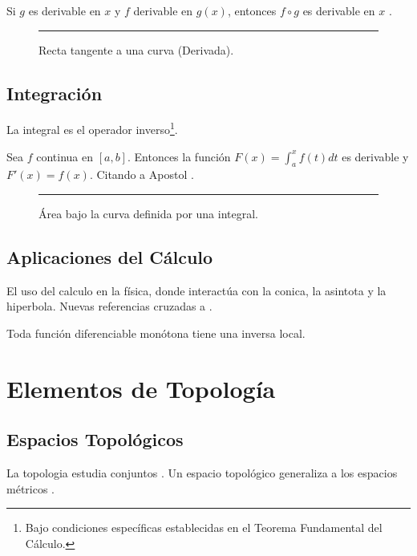 	\begin{lemma}
		Si $g$ es derivable en $x$ y $f$ derivable en $g(x)$, entonces $f \circ g$ es derivable en $x$ \cite{rudin}.
	\end{lemma}
	
	\begin{figure}[h]
		\centering
		\rule{5cm}{3cm}
		\caption{Recta tangente a una curva (Derivada).}
	\end{figure}
	
	\section{Integración}
	La \gls{integral} es el operador inverso\footnote{Bajo condiciones específicas establecidas en el Teorema Fundamental del Cálculo.}.
	
	\begin{theorem}
		Sea $f$ continua en $[a,b]$. Entonces la función $F(x) = \int_a^x f(t)dt$ es derivable y $F'(x) = f(x)$. Citando a Apostol \cite{apostol}.
	\end{theorem}
	
	\begin{figure}[h]
		\centering
		\rule{5cm}{3cm}
		\caption{Área bajo la curva definida por una integral.}
	\end{figure}
	
	\section{Aplicaciones del Cálculo}
	El uso del \gls{calculo} en la física, donde interactúa con la \gls{conica}, la \gls{asintota} y la \gls{hiperbola}. Nuevas referencias cruzadas a \cite{anton, munkres}.
	
	\begin{proposition}
		Toda función diferenciable monótona tiene una inversa local.
	\end{proposition}
	
	\chapter{Elementos de Topología}
	
	\section{Espacios Topológicos}
	La \gls{topologia} estudia conjuntos \cite{munkres}. Un \gls{espacio} topológico generaliza a los espacios métricos \cite{rudin}.
	
